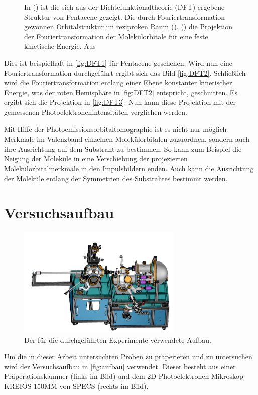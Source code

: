 \begin{figure}
\begin{subfigure}{0.3\textwidth}
                \caption{}
                \label{fig:DFT3}
            \end{subfigure}
            \caption{In () ist die sich aus der Dichtefunktionaltheorie (DFT) ergebene Struktur von Pentacene gezeigt.
            Die durch Fouriertransformation gewonnen Orbitalstruktur im reziproken Raum ().
            () die Projektion der Fouriertransformation der Molekülorbitale für eine feste kinetische Energie.
            Aus~\cite{MM_2}}
            \label{fig:DFT}
        \end{figure}
        Dies ist beispielhaft in \autoref{fig:DFT1} für Pentacene geschehen.
        Wird nun eine Fouriertransformation durchgeführt ergibt sich das Bild \autoref{fig:DFT2}.
        Schließlich wird die Fouriertransformation entlang einer Ebene konstanter kinetischer Energie, was der roten Hemisphäre in \autoref{fig:DFT2} entspricht, geschnitten.
        Es ergibt sich die Projektion in \autoref{fig:DFT3}.
        Nun kann diese Projektion mit der gemessenen Photoelektronenintensitäten verglichen werden.

        Mit Hilfe der Photoemissionsorbitaltomographie ist es nicht nur möglich Merkmale im Valenzband einzelnen Molekülorbitalen zuzuordnen, sondern auch ihre Ausrichtung auf dem Substraht zu bestimmen.
        So kann zum Beispiel die Neigung der Moleküle in eine Verschiebung der projezierten Molekülorbitalmerkmale in den Impulsbildern enden.
        Auch kann die Ausrichtung der Moleküle entlang der Symmetrien des Substrahtes bestimmt werden.

    \section{Versuchsaufbau}
    \label{sec:Versuchsaufbau}
        \begin{figure}
            \centering
            \includegraphics[width=0.7\textwidth]{MM.png}
            \caption{Der für die durchgeführten Experimente verwendete Aufbau.}
            \label{fig:aufbau}
        \end{figure}
        Um die in dieser Arbeit untersuchten Proben zu präperieren und zu untersuchen wird der Versuchsaufbau in \autoref{fig:aufbau} verwendet.
        Dieser besteht aus einer Präperationskammer (links im Bild) und dem 2D Photoelektronen Mikroskop KREIOS 150MM von SPECS (rechts im Bild).

